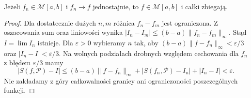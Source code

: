 \begin{wniosek}\label{it:cor:mcshane-uniform}
Jeżeli $f_n\in\mathcal M[a,b]$ i $f_n\to f$ jednostajnie,
to $f\in\mathcal M[a,b]$ i całki zbiegają.
\end{wniosek}
\begin{proof}
Dla dostatecznie dużych $n,m$ różnica $f_n-f_m$ jest
ograniczona. Z oszacowania sum oraz liniowości wynika
$|I_n-I_m|\le(b-a)\|f_n-f_m\|_\infty$.
Stąd $I=\lim I_n$ istnieje. Dla $\varepsilon>0$ wybieramy
$n$ tak, aby $(b-a)\|f-f_n\|_\infty<\varepsilon/3$
oraz $|I_n-I|<\varepsilon/3$. Na wolnych podziałach
drobnych względem cechowania dla $f_n$ z błędem
$\varepsilon/3$ mamy
\[
 |S(f,\mathcal P)-I|
 \le (b-a)\|f-f_n\|_\infty+|S(f_n,\mathcal P)-I_n|
     +|I_n-I|<\varepsilon.
\]
Nie zakładamy z góry całkowalności granicy ani ograniczoności
poszczególnych funkcji.
\end{proof}


